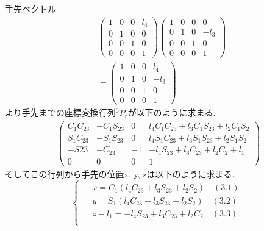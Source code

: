 \documentclass[a4j]{jarticle}			%
\begin{document}
\begin{multicols}{2}
手先ベクトル
\tiny
\begin{equation*}
	\begin{array}{cccc}
		&\left( 
			\begin{array}{cccc}
				1 & 0 & 0 & l_4\\
				0 & 1 & 0 & 0\\
				0 & 0 & 1 & 0\\
				0 & 0 & 0 & 1 
			\end{array}
		\right)
		\left( 
			\begin{array}{cccc}
				1 & 0 & 0 & 0\\
				0 & 1 & 0 & -l_3\\
				0 & 0 & 1 & 0\\
				0 & 0 & 0 & 1 
			\end{array}
			\right)\\
		&=
		\left( 
		\begin{array}{cccc}
			1 & 0 & 0 & l_4\\
			0 & 1 & 0 & -l_3\\
			0 & 0 & 1 & 0\\
			0 & 0 & 0 & 1 
		\end{array}
		\right)
	\end{array}
\end{equation*}
\small
より手先までの座標変換行列$^{0}P_{r}$が以下のように求まる.
\tiny
\begin{equation*}
	\begin{array}{cc}
		\left( 
			\begin{array}{cccc}
				C_1C_{23} & -C_1S_{23} & 0 & l_4C_1C_{23}+l_3C_1S_{23}+l_2C_1S_2 \\
				S_1C_{23} & -S_1S_{23} & 0 & l_4S_1C_{23}+l_3S_1S_{23}+l_2S_1S_2 \\
				-S{23} & -C_{23} & -1 & -l_4S_{23}+l_3C_{23}+l_2C_2+l_1 \\
				0 & 0 & 0 & 1 
			\end{array}
		\right)
	\end{array}
\end{equation*}
\small
そしてこの行列から手先の位置x, y, zは以下のように求まる.
\begin{equation*}
	\left\{
		\begin{array}{c}
		\begin{split}
			&x=C_1(l_4C_{23}+l_3S_{23}+l_2S_2)\quad(3.1) \\
			&y=S_1(l_4C_{23}+l_3S_{23}+l_2S_2)\quad(3.2) \\
			&z-l_1=-l_4S_{23}+l_3C_{23}+l_2C_2\quad(3.3) \\

\end{split}
\end{array}
\end{equation*}
\end{multicols}
\end{document}
